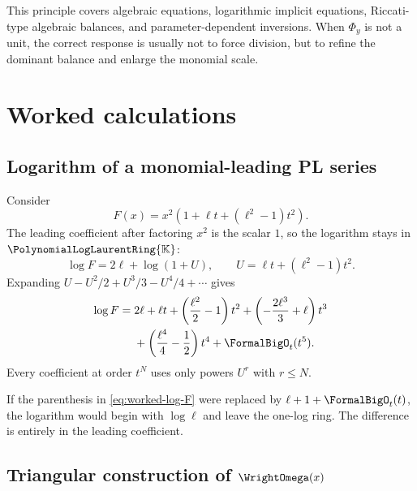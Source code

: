 \documentclass[11pt,oneside]{article}
\numberwithin{equation}{section}
\theoremstyle{definition}
\newcommand{\K}{\mathbb{K}}
\newcommand{\PL}{\PolynomialLogLaurentRing{\K}}
\begin{document}
This principle covers algebraic equations, logarithmic implicit equations,
Riccati-type algebraic balances, and parameter-dependent inversions.  When
\(\Phi_y\) is not a unit, the correct response is usually not to force division,
but to refine the dominant balance and enlarge the monomial scale.

\section{Worked calculations}\label{sec:worked}

\subsection{Logarithm of a monomial-leading PL series}

Consider
\begin{equation}\label{eq:worked-log-F}
  F(x)=x^2\left(1+\ell t+(\ell^2-1)t^2\right).
\end{equation}
The leading coefficient after factoring \(x^2\) is the scalar \(1\), so the
logarithm stays in \(\PL\):
\[
  \log F=2\ell+\log(1+U),
  \qquad U=\ell t+(\ell^2-1)t^2.
\]
Expanding \(U-U^2/2+U^3/3-U^4/4+\cdots\) gives
\begin{align}
 \log F={}&2\ell+\ell t
 +\left(\frac{\ell^2}{2}-1\right)t^2
 +\left(-\frac{2\ell^3}{3}+\ell\right)t^3\nonumber\\
 &+\left(\frac{\ell^4}{4}-\frac12\right)t^4
 +\FormalBigO_t(t^5).
 \label{eq:worked-log-result}
\end{align}
Every coefficient at order \(t^N\) uses only powers \(U^r\) with \(r\le N\).

If the parenthesis in \eqref{eq:worked-log-F} were replaced by
\(\ell+1+\FormalBigO_t(t)\), the logarithm would begin with \(\log\ell\) and leave the
one-log ring.  The difference is entirely in the leading coefficient.

\subsection{Triangular construction of \(\WrightOmega(x)\)}
\end{document}
